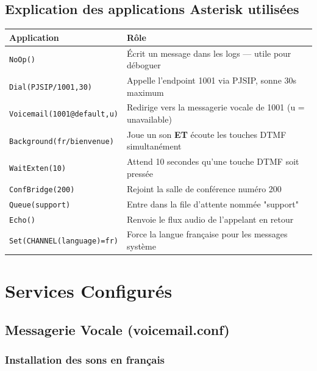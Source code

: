 \documentclass[a4paper,11pt]{report}
\begin{document}
\section{Explication des applications Asterisk utilisées}

\begin{center}
\begin{tabularx}{\textwidth}{lX}
\toprule
\rowcolor{primarylight}\textbf{Application} & \textbf{Rôle}\\
\midrule
\texttt{NoOp()} & Écrit un message dans les logs — utile pour déboguer\\
\texttt{Dial(PJSIP/1001,30)} & Appelle l'endpoint 1001 via PJSIP, sonne 30s maximum\\
\texttt{Voicemail(1001@default,u)} & Redirige vers la messagerie vocale de 1001 (u = unavailable)\\
\texttt{Background(fr/bienvenue)} & Joue un son \textbf{ET} écoute les touches DTMF simultanément\\
\texttt{WaitExten(10)} & Attend 10 secondes qu'une touche DTMF soit pressée\\
\texttt{ConfBridge(200)} & Rejoint la salle de conférence numéro 200\\
\texttt{Queue(support)} & Entre dans la file d'attente nommée "support"\\
\texttt{Echo()} & Renvoie le flux audio de l'appelant en retour\\
\texttt{Set(CHANNEL(language)=fr)} & Force la langue française pour les messages système\\
\bottomrule
\end{tabularx}
\end{center}

\chapter{Services Configurés}

\section{Messagerie Vocale (voicemail.conf)}

\subsection{Installation des sons en français}
\end{document}
